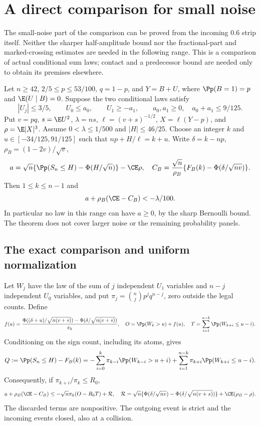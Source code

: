 \section{A direct comparison for small noise}
\label{v10:smallnoise}

The small-noise part of the comparison can be proved from the incoming
$0.6$ strip itself. Neither the sharper half-amplitude bound nor the
fractional-part and marked-crossing estimates are needed in the following
range. This is a comparison of actual conditional sum laws; contact and a
predecessor bound are needed only to obtain its premises elsewhere.

\begin{theorem}\label{v10:smallnoise:theorem}
Let $n\ge42$, $2/5\le p\le53/100$, $q=1-p$, and $Y=B+U$, where
$\Pp(B=1)=p$ and $\E(U\mid B)=0$. Suppose the two conditional laws satisfy
\[
 |U_j|\le3/5,\qquad U_0\le a_0,\qquad U_1\ge-a_1,
 \qquad a_0,a_1\ge0,\quad a_0+a_1\le9/125.
\]
Put $v=pq$, $s=\E U^2$, $\lambda=ns$, $\ell=(v+s)^{-1/2}$,
$X=\ell(Y-p)$, and $\rho=\E|X|^3$. Assume
$0<\lambda\le1/500$ and $|H|\le46/25$.
Choose an integer $k$ and $u\in[-34/125,91/125]$ such that
$np+H/\ell=k+u$. Write $\delta=k-np$, $\rho_B=(1-2v)/\sqrt v$,
\[
 a=\sqrt n\{\Pp(S_n\le H)-\Phi(H/\sqrt n)\}-\CE\rho,
 \quad
 C_B=\frac{\sqrt n}{\rho_B}
       \{F_B(k)-\Phi(\delta/\sqrt{nv})\}.
\]
Then $1\le k\le n-1$ and
\[
                 a+\rho_B(\CE-C_B)<-\lambda/100.
\]
In particular no law in this range can have $a\ge0$, by the sharp
Bernoulli bound. The theorem does not cover larger noise or the remaining
probability panels.
\end{theorem}

\subsection{The exact comparison and uniform normalization}
Let $W_j$ have the law of the sum of $j$ independent $U_1$ variables and
$n-j$ independent $U_0$ variables, and put
$\pi_j=\binom njp^jq^{n-j}$, zero outside the legal counts. Define
\[
 f(u)=\frac{\Phi((\delta+u)/\sqrt{n(v+s)})-
                   \Phi(\delta/\sqrt{n(v+s)})}{\pi_k},
 \quad O=\Pp(W_k>u)+f(u),
 \quad T=\sum_{i=1}^{n-k}\Pp(W_{k+i}\le u-i).
\]
Conditioning on the sign count, including its atoms, gives
\[
 Q:=\Pp(S_n\le H)-F_B(k)
 =-\sum_{i=0}^k\pi_{k-i}\Pp(W_{k-i}>u+i)
   +\sum_{i=1}^{n-k}\pi_{k+i}\Pp(W_{k+i}\le u-i).
\]
Consequently, if $\pi_{k+i}/\pi_k\le R_0$,
\begin{equation}\label{v10:smallnoise:comparison}
 a+\rho_B(\CE-C_B)
 \le-\sqrt n\pi_k(O-R_0T)+\mathcal R,
 \quad
 \mathcal R=\sqrt n\{\Phi(\delta/\sqrt{nv})-
                  \Phi(\delta/\sqrt{n(v+s)})\}+\CE(\rho_B-\rho).
\end{equation}
The discarded terms are nonpositive. The outgoing event is strict and
the incoming events closed, also at a collision.

